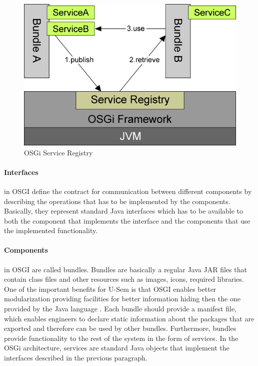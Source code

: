 \begin{figure}[h!]
  \centering
  	\includegraphics[scale=0.6]{plug-in/OSGI.png}
  \caption{OSGi Service Registry \cite{Andre}}
  \label{fig_osgi}
\end{figure}

\paragraph{Interfaces}
 in OSGI define the contract for communication between different components by describing the operations that has to be implemented by the components. Basically, they represent standard Java interfaces which has to be available to both the component that implements the interface and the components that use the implemented functionality.


\paragraph{Components}
  in OSGI are called bundles. Bundles are basically a regular Java JAR files that contain class files and other resources such as images, icons, required libraries. One of the important benefits for U-Sem is that OSGI enables better modularization providing facilities for better information hiding then the one provided by the Java language \cite{Andre}. Each bundle should provide a manifest file, which enables engineers to declare static information about the packages that are exported and therefore can be used by other bundles. Furthermore, bundles provide functionality to the rest of the system in the form of services. In the OSGi architecture, services are standard Java objects that implement the interfaces described in the previous paragraph.

